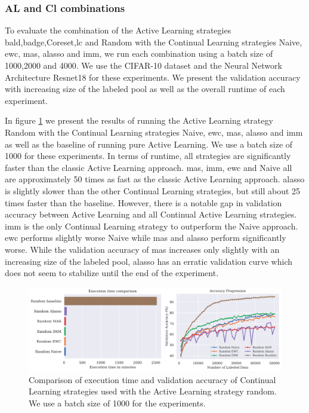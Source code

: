 \subsubsection{AL and Cl combinations}
\label{sec:Evaluation:Results:CAL:ALCL}
To evaluate the combination of the Active Learning strategies \gls{bald},\gls{badge},Coreset,\gls{lc} and Random with the Continual Learning strategies Naive, \gls{ewc}, \gls{mas}, \gls{alasso} and \gls{imm}, we run each combination
using a batch size of 1000,2000 and 4000. We use the CIFAR-10 dataset and the Neural Network Architecture Resnet18 for these experiments. We present the validation accuracy with increasing
size of the labeled pool as well as the overall runtime of each experiment. \par
In figure \ref{fig:Evaluation:Results:CAL:Random1000} we present the results of running the Active Learning strategy Random with the Continual Learning strategies Naive, \gls{ewc}, \gls{mas}, \gls{alasso} and \gls{imm}
as well as the baseline of running pure Active Learning. We use a batch size of 1000 for these experiments. In terms of runtime, all strategies are significantly faster than the classic Active
Learning approach. \gls{mas}, \gls{imm}, \gls{ewc} and Naive all are approximately 50 times as fast as the classic Active Learning approach. \gls{alasso} is slightly slower than the other Continual Learning strategies,
but still about 25 times faster than the baseline. However, there is a notable gap in validation accuracy between Active Learning and all Continual Active Learning strategies. \gls{imm} is the only
Continual Learning strategy to outperform the Naive approach. \gls{ewc} performs slightly worse Naive while \gls{mas} and \gls{alasso} perform significantly worse. While the validation accuracy of \gls{mas} increases only
slightly with an increasing size of the labeled pool, \gls{alasso} has an erratic validation curve which does not seem to stabilize until the end of the experiment. \par
\begin{figure}[h]
    \centering
    \includegraphics[width=\linewidth]{images/results_CAL/Random_CAL_1000b.png}
    \caption[Continual Active Learning Random 1000 batch size]{Comparison of execution time and validation accuracy of Continual Learning strategies used with the Active Learning strategy random.
    We use a batch size of 1000 for the experiments.}
    \label{fig:Evaluation:Results:CAL:Random1000}
\end{figure}

